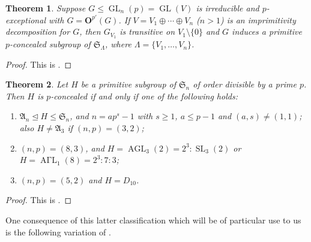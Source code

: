 \documentclass[12pt]{amsart}
\theoremstyle{theorem}
\newtheorem{teo}{Theorem}
\theoremstyle{definition}
\newcommand{\fA} {\mathfrak A}
\newcommand{\fS} {\mathfrak S}
\newcommand{\bO}{{\mathbf O}}
\newcommand{\GL}{\operatorname{GL}}
\newcommand{\AGL}{\operatorname{AGL}}
\newcommand{\AGaL}{\operatorname{A\Gamma L}}
\newcommand{\SL}{\operatorname{SL}}
\begin{document}
	\begin{teo}   \label{t3}
		Suppose $G\leq \GL_n(p)=\GL(V)$ is irreducible and $p$-exceptional with
		$G=\bO^{p'}(G)$. If $V=V_1\oplus\cdots\oplus V_n$ ($n>1$) is an
		imprimitivity decomposition for $G$, then $G_{V_1}$ is transitive on
		$V_1\setminus\{0\}$ and $G$ induces a primitive $p$-concealed subgroup of
		$\fS_\Lambda$, where $\Lambda=\{V_1,\dots, V_n\}$.
	\end{teo}
	
	\begin{proof}
		This is \cite[Thm~3]{GLPST}.
	\end{proof}
	
	\begin{teo}
		
		\label{t2}
		Let $H$ be a primitive subgroup of $\fS_n$ of order divisible by a prime $p$.
		Then $H$ is $p$-concealed if and only if one of the following holds:
		\begin{enumerate}
			\item $\fA_n\trianglelefteq H\leq \fS_n$, and $n=ap^s-1$ with $s\geq 1$,
			$a\leq p-1$ and $(a,s)\neq(1,1)$; also $H\neq\fA_3$ if $(n,p)=(3,2)$;
			\item $(n,p)=(8,3)$, and $H=\AGL_3(2)=2^3:\SL_3(2)$ or
			$H=\AGaL_1(8)=2^3:7:3$;
			\item $(n,p)=(5,2)$ and $H=D_{10}$. 
		\end{enumerate}
	\end{teo}
	
	\begin{proof}
		This is \cite[Thm~2]{GLPST}.
	\end{proof}
	
	One consequence of this latter classification which will be of particular use to us is the following variation of \cite[Lemma 3.4]{MinimalHeights}.
		
\end{document}
